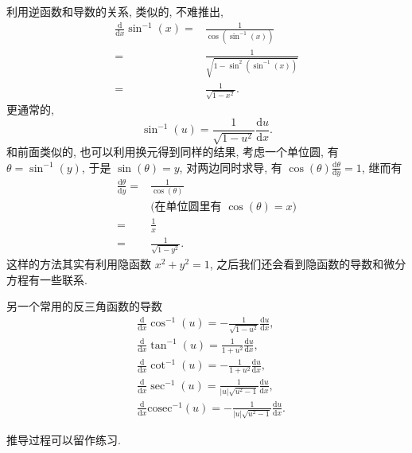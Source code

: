 \begin{tcolorbox}[size=fbox, breakable, enhanced jigsaw, title={反三角函数}]

利用逆函数和导数的关系, 类似的, 不难推出,
\begin{align*}
\frac{\mathrm{d}}{\mathrm{d}x}\sin^{-1}(x)=&\frac{1}{\cos(\sin^{-1}(x))}\\
=&\frac{1}{\sqrt{1-\sin^2(\sin^{-1}(x))}}\\
=&\frac{1}{\sqrt{1-x^2}}.
\end{align*}
更通常的, \begin{equation*}
\boxed{\sin^{-1}(u)=\frac{1}{\sqrt{1-u^2}}\frac{\mathrm{d}u}{\mathrm{d}x}}.
\end{equation*} 和前面类似的, 也可以利用换元得到同样的结果, 考虑一个单位圆, 有
$\theta=\sin^{-1}(y)$, 于是 $\sin(\theta)=y$, 对两边同时求导, 有
$\cos(\theta)\frac{\mathrm{d}\theta}{\mathrm{d}y}=1$, 继而有
\begin{align*}
\frac{\mathrm{d}\theta}{\mathrm{d}y}=&\frac{1}{\cos(\theta)}\\
&\text{(在单位圆里有 }\cos(\theta)= x\text{)}\\
=&\frac{1}{x}\\
=&\frac{1}{\sqrt{1-y^2}}.
\end{align*}
这样的方法其实有利用隐函数 $x^2+y^2=1$,
之后我们还会看到隐函数的导数和微分方程有一些联系.

另一个常用的反三角函数的导数
$$\boxed{\begin{aligned}&\frac{\mathrm{d}}{\mathrm{d}x}\cos^{-1}(u)=-\frac{1}{\sqrt{1-u^2}}\frac{\mathrm{d}u}{\mathrm{d}x},\\
&\frac{\mathrm{d}}{\mathrm{d}x}\tan^{-1}(u)=\frac{1}{1+u^2}\frac{\mathrm{d}u}{\mathrm{d}x},\\
&\frac{\mathrm{d}}{\mathrm{d}x}\cot^{-1}(u)=-\frac{1}{1+u^2}\frac{\mathrm{d}u}{\mathrm{d}x},\\
&\frac{\mathrm{d}}{\mathrm{d}x}\sec^{-1}(u)=\frac{1}{|u|\sqrt{u^2-1}}\frac{\mathrm{d}u}{\mathrm{d}x},\\
&\frac{\mathrm{d}}{\mathrm{d}x}\mathrm{cosec}^{-1}(u)=-\frac{1}{|u|\sqrt{u^2-1}}\frac{\mathrm{d}u}{\mathrm{d}x}.\end{aligned}}$$

推导过程可以留作练习.

\end{tcolorbox}